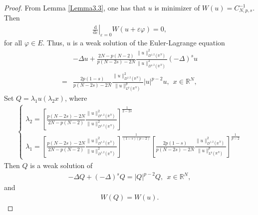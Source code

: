 \documentclass[12pt,a4paper,reqno]{amsart}
\numberwithin{equation}{section}
\begin{document}
\begin{proof}
From Lemma \ref{Lemma3.3}, one has that
$u$ is minimizer of $W(u)=C_{N,p,s}^{-1}$.
Then
\begin{equation*}
\begin{aligned}
\left.\frac{\mathrm{d}}
{\mathrm{d}\varepsilon}\right|_{\varepsilon=0}W(u+\varepsilon \varphi)=0,
\end{aligned}
\end{equation*}
for all $\varphi\in E$.
Thus, $u$ is a weak solution of the Euler-Lagrange equation
\begin{equation*}
\begin{aligned}
&-\Delta u
+\frac{2N-p(N-2)}{p(N-2s)-2N}
\frac{
\|u\|_{D^{1,2}(\mathbb{R}^{N})}^{2}
}
{\|u\|_{D^{s,2}(\mathbb{R}^{N})}^{2}}
(-\Delta)^{s}u\\
=&
\frac{2p(1-s)}{p(N-2s)-2N}
\frac{\|u\|_{D^{1,2}(\mathbb{R}^{N})}^{2}}
{\|u\|_{L^{p}(\mathbb{R}^{N})}^{p}}
|u|^{p-2}u, \ \ x\in\mathbb{R}^{N},
\end{aligned}
\end{equation*}
Set $Q=\lambda_{1}u(\lambda_{2}x)$, where
\begin{equation*}
\begin{aligned}
\begin{cases}
\lambda_{2}=
\left[
\frac{p(N-2s)-2N}{2N-p(N-2)}
\frac{
\|u\|_{D^{s,2}(\mathbb{R}^{N})}^{2}
}
{\|u\|_{D^{1,2}(\mathbb{R}^{N})}^{2}}\right]^{\frac{1}{2-2s}}\\
\lambda_{1}=\left[
\frac{p(N-2s)-2N}{2N-p(N-2)}
\frac{
\|u\|_{D^{s,2}(\mathbb{R}^{N})}^{2}
}
{\|u\|_{D^{1,2}(\mathbb{R}^{N})}^{2}}\right]^{\frac{1}{(1-s)(p-2)}}
\left[
\frac{2p(1-s)}{p(N-2s)-2N}
\frac{\|u\|_{D^{1,2}(\mathbb{R}^{N})}^{2}}
{\|u\|_{L^{p}(\mathbb{R}^{N})}^{p}}
\right]^{\frac{1}{p-2}}
\end{cases}
\end{aligned}
\end{equation*}
Then $Q$ is a weak solution of
\begin{equation*}
\begin{aligned}
-\Delta Q
+(-\Delta)^{s}Q =
|Q|^{p-2}Q, \ \ x\in\mathbb{R}^{N},
\end{aligned}
\end{equation*}
and
\begin{equation*}
\begin{aligned}
W(Q)=W(u).
\end{aligned}
\end{equation*}
\end{proof}
\end{document}
